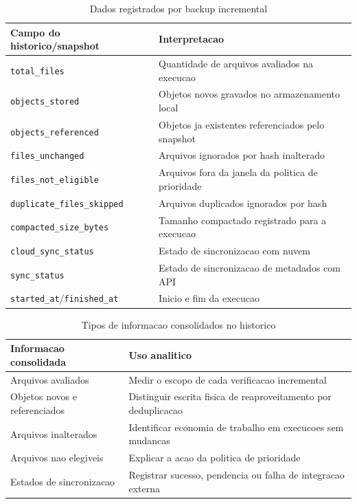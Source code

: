 \documentclass[12pt,a4paper]{article}
\begin{document}
\begin{table}[h]
\centering
\caption{Dados registrados por backup incremental}
\begin{tabular}{L{0.34\textwidth}L{0.52\textwidth}}
\toprule
Campo do historico/snapshot & Interpretacao \\
\midrule
\texttt{total\_files} & Quantidade de arquivos avaliados na execucao \\
\texttt{objects\_stored} & Objetos novos gravados no armazenamento local \\
\texttt{objects\_referenced} & Objetos ja existentes referenciados pelo snapshot \\
\texttt{files\_unchanged} & Arquivos ignorados por hash inalterado \\
\texttt{files\_not\_eligible} & Arquivos fora da janela da politica de prioridade \\
\texttt{duplicate\_files\_skipped} & Arquivos duplicados ignorados por hash \\
\texttt{compacted\_size\_bytes} & Tamanho compactado registrado para a execucao \\
\texttt{cloud\_sync\_status} & Estado de sincronizacao com nuvem \\
\texttt{sync\_status} & Estado de sincronizacao de metadados com API \\
\texttt{started\_at}/\texttt{finished\_at} & Inicio e fim da execucao \\
\bottomrule
\end{tabular}
\end{table}

\begin{table}[h]
\centering
\caption{Tipos de informacao consolidados no historico}
\begin{tabular}{L{0.34\textwidth}L{0.50\textwidth}}
\toprule
Informacao consolidada & Uso analitico \\
\midrule
Arquivos avaliados & Medir o escopo de cada verificacao incremental \\
Objetos novos e referenciados & Distinguir escrita fisica de reaproveitamento por deduplicacao \\
Arquivos inalterados & Identificar economia de trabalho em execucoes sem mudancas \\
Arquivos nao elegiveis & Explicar a acao da politica de prioridade \\
Estados de sincronizacao & Registrar sucesso, pendencia ou falha de integracao externa \\
\bottomrule
\end{tabular}
\end{table}
\end{document}
